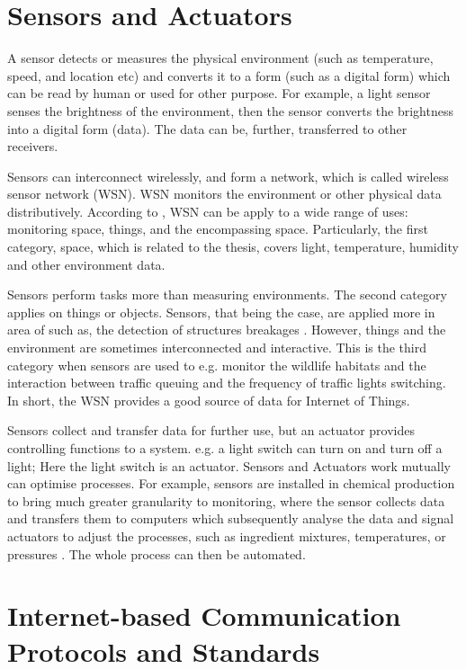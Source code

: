 \section{Sensors and Actuators}
A sensor detects or measures the physical environment (such as temperature, speed, and location etc) and converts it to a form (such as a digital form) which can be read by human or used for other purpose. For example, a light sensor senses the brightness of the environment, then the sensor converts the brightness into a digital form (data). The data can be, further, transferred to other receivers.

Sensors can interconnect wirelessly, and form a network, which is called wireless sensor network (WSN). WSN monitors the environment or other physical data distributively. According to \cite{culler2004guest}, WSN can be apply to a wide range of uses: monitoring space, things, and the encompassing space. Particularly, the first category, space, which is related to the thesis, covers light, temperature, humidity and other environment data. 

Sensors perform tasks more than measuring environments. The second category applies on things or objects. Sensors, that being the case, are applied more in area of such as, the detection of structures breakages \cite{christin2009wireless}. However, things and the environment are sometimes interconnected and interactive. This is the third category when sensors are used to e.g. monitor the wildlife habitats \cite{culler2004guest} and the interaction between traffic queuing and the frequency of traffic lights switching. In short, the WSN provides a good source of data for Internet of Things.

Sensors collect and transfer data for further use, but an actuator provides controlling functions to a system. e.g. a light switch can turn on and turn off a light; Here the light switch is an actuator. Sensors and Actuators work mutually can optimise processes. For example, sensors are installed in chemical production to bring much greater granularity to monitoring, where the sensor collects data and transfers them to computers which subsequently analyse the data and signal actuators to adjust the processes, such as ingredient mixtures, temperatures, or pressures \cite{chui2010internet}. The whole process can then be automated. 

\section{Internet-based Communication Protocols and Standards}

